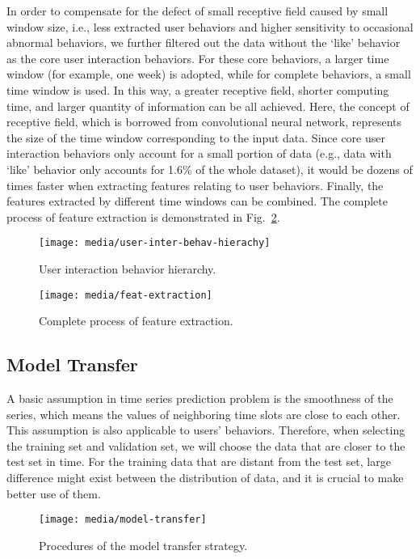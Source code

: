 \documentclass{article}
\begin{document}
In order to compensate for the defect of small receptive field caused by small window size, i.e., less extracted user behaviors and higher sensitivity to occasional abnormal behaviors, we further filtered out the data without the ‘like’ behavior as the core user interaction behaviors.
For these core behaviors, a larger time window (for example, one week) is adopted, while for complete behaviors, a small time window is used.
In this way, a greater receptive field, shorter computing time, and larger quantity of information can be all achieved. Here, the concept of receptive field, which is borrowed from convolutional neural network, represents the size of the time window corresponding to the input data.
Since core user interaction behaviors only account for a small portion of data (e.g., data with ‘like’ behavior only accounts for 1.6\% of the whole dataset), it would be dozens of times faster when extracting features relating to user behaviors.
Finally, the features extracted by different time windows can be combined. The complete process of feature extraction is demonstrated in Fig.~\ref{fig:feat-extraction}.

\begin{figure}[h]
  \centering
  \texttt{[image: media/user-inter-behav-hierachy]}
  \caption{User interaction behavior hierarchy.}
  \label{fig:user-inter-behav-hierachy}
\end{figure}

\begin{figure}[h]
  \centering
  \texttt{[image: media/feat-extraction]}
  \caption{Complete process of feature extraction.}
  \label{fig:feat-extraction}
\end{figure}


\subsection{Model Transfer}
\label{sec:model-transfer}

A basic assumption in time series prediction problem is the smoothness of the series, which means the values of neighboring time slots are close to each other. This assumption is also applicable to users' behaviors. Therefore, when selecting the training set and validation set, we will choose the data that are closer to the test set in time. For the training data that are distant from the test set, large difference might exist between the distribution of data, and it is crucial to make better use of them.

\begin{figure*}[h!]
  \centering
  \texttt{[image: media/model-transfer]}
  \caption{Procedures of the model transfer strategy.}
  \label{fig:model-transfer}
\end{figure*}
\end{document}
